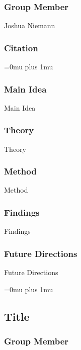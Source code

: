 \subsubsection{Group Member}

\noindent
Joshua Niemann

\noindent
\subsubsection{Citation}

\Urlmuskip=0mu plus 1mu\relax

\subsubsection{Main Idea}

\noindent
Main Idea

\subsubsection{Theory}

\noindent
Theory

\subsubsection{Method}

\noindent
Method

\subsubsection{Findings}

\noindent
Findings

\subsubsection{Future Directions}

\noindent
Future Directions 

\Urlmuskip=0mu plus 1mu\relax

\noindent
\subsection{Title}

\subsubsection{Group Member}

